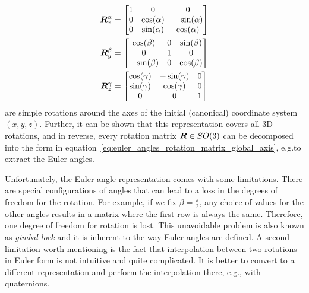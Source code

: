 		\begin{align}
			\begin{split}
				\bm{R}_{x}^\alpha &= 
				\begin{bmatrix}
					1 & 0 				& 0 			\\
					0 & \cos(\alpha) 	& -\sin(\alpha) \\
					0 & \sin(\alpha) 	& \cos(\alpha)
				\end{bmatrix}
				\\
				\bm{R}_{y}^\beta &= 
				\begin{bmatrix}
					\cos(\beta) 	& 0 	& \sin(\beta) 	\\
					0 				& 1 	& 0 			\\
					-\sin(\beta) 	& 0 	& \cos(\beta)
				\end{bmatrix}
				\\
				\bm{R}_{z}^\gamma &=  
				\begin{bmatrix}
					\cos(\gamma) 	& -\sin(\gamma) 	& 0 \\
					\sin(\gamma) 	& \cos(\gamma) 		& 0 \\
					0 				& 0 				& 1 
				\end{bmatrix}
			\end{split}
		\end{align}
		are simple rotations around the axes of the initial (canonical) coordinate system $(x, y, z)$.
		Further, it can be shown that this representation covers all 3D rotations, and in reverse, every rotation matrix $\bm{R} \in SO(3)$ can be decomposed into the form in equation~\ref{eq:euler_angles_rotation_matrix_global_axis}, e.g.\@ to extract the Euler angles.
		
		Unfortunately, the Euler angle representation comes with some limitations.
		There are special configurations of angles that can lead to a loss in the degrees of freedom for the rotation. 
		For example, if we fix $\beta = \frac{\pi}{2}$, any choice of values for the other angles results in a matrix where the first row is always the same.
		Therefore, one degree of freedom for rotation is lost.
		This unavoidable problem is also known as \emph{gimbal lock} and it is inherent to the way Euler angles are defined.
		A second limitation worth mentioning is the fact that interpolation between two rotations in Euler form is not intuitive and quite complicated.
		It is better to convert to a different representation and perform the interpolation there, e.g., with quaternions.
		
